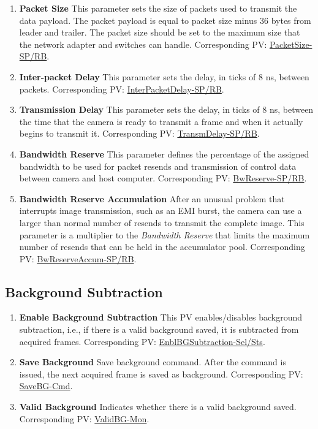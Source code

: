 \documentclass[openany]{article}
\begin{document}
\begin{enumerate}
            \item \textbf{Packet Size} This parameter sets the size of packets used to transmit the data payload. The packet payload is equal to packet size minus 36 bytes from leader and trailer. The packet size should be set to the maximum size that the network adapter and switches can handle. Corresponding PV: \hyperlink{pv:packet-size}{PacketSize-SP/RB}.
            \item \textbf{Inter-packet Delay} This parameter sets the delay, in ticks of 8 ns, between packets. Corresponding PV: \hyperlink{pv:inter-packet-delay}{InterPacketDelay-SP/RB}.
            \item \textbf{Transmission Delay} This parameter sets the delay, in ticks of 8 ns, between the time that the camera is ready to transmit a frame and when it actually begins to transmit it. Corresponding PV: \hyperlink{pv:transm-delay}{TransmDelay-SP/RB}.
            \item \textbf{Bandwidth Reserve} This parameter defines the percentage of the assigned bandwidth to be used for packet resends and transmission of control data between camera and host computer. Corresponding PV: \hyperlink{pv:bw-reserve}{BwReserve-SP/RB}.
            \item \textbf{Bandwidth Reserve Accumulation} After an unusual problem that interrupts image transmission, such as an EMI burst, the camera can use a larger than normal number of resends to transmit the complete image. This parameter is a multiplier to the \emph{Bandwidth Reserve} that limits the maximum number of resends that can be held in the accumulator pool. Corresponding PV: \hyperlink{pv:bw-reserve-accum}{BwReserveAccum-SP/RB}.
        \end{enumerate}

    \subsection{Background Subtraction}\label{sec:background-sub}

        \begin{enumerate}
            \item \textbf{Enable Background Subtraction} This PV enables/disables background subtraction, i.e., if there is a valid background saved, it is subtracted from acquired frames. Corresponding PV: \hyperlink{pv:enbl-bg-subtraction}{EnblBGSubtraction-Sel/Sts}.
            \item \textbf{Save Background} Save background command. After the command is issued, the next acquired frame is saved as background. Corresponding PV: \hyperlink{pv:save-bg}{SaveBG-Cmd}.
            \item \textbf{Valid Background} Indicates whether there is a valid background saved. Corresponding PV: \hyperlink{pv:valid-bg}{ValidBG-Mon}.
        \end{enumerate}
\end{document}
